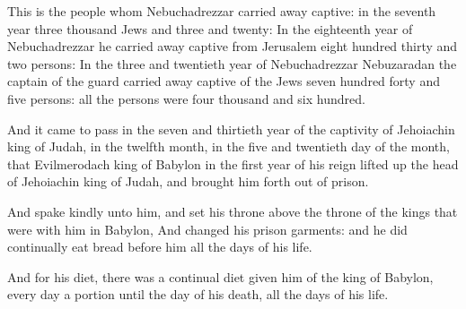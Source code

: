 \verse This is the people whom Nebuchadrezzar carried away captive: in the seventh year three thousand Jews and three and twenty: \verse In the eighteenth year of Nebuchadrezzar he carried away captive from Jerusalem eight hundred thirty and two persons: \verse In the three and twentieth year of Nebuchadrezzar Nebuzaradan the captain of the guard carried away captive of the Jews seven hundred forty and five persons: all the persons were four thousand and six hundred.

\verse And it came to pass in the seven and thirtieth year of the captivity of Jehoiachin king of Judah, in the twelfth month, in the five and twentieth day of the month, that Evilmerodach king of Babylon in the first year of his reign lifted up the head of Jehoiachin king of Judah, and brought him forth out of prison.

\verse And spake kindly unto him, and set his throne above the throne of the kings that were with him in Babylon, \verse And changed his prison garments: and he did continually eat bread before him all the days of his life.

\verse And for his diet, there was a continual diet given him of the king of Babylon, every day a portion until the day of his death, all the days of his life.

